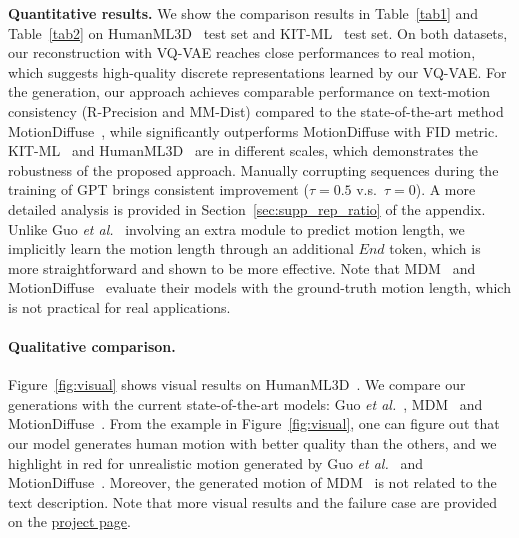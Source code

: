 \documentclass[10pt,twocolumn,letterpaper]{article}
\begin{document}
\noindent\textbf{Quantitative results.} 
We show the comparison results in Table~\ref{tab1} and Table~\ref{tab2} on HumanML3D~\cite{guo2022generating} test set and KIT-ML~\cite{plappert2016kit} test set. On both datasets, our reconstruction with VQ-VAE reaches close performances to real motion, which suggests high-quality discrete representations learned by our VQ-VAE. For the generation, our approach achieves comparable performance on text-motion consistency (R-Precision and MM-Dist) compared to the state-of-the-art method MotionDiffuse~\cite{zhang2022motiondiffuse}, while significantly outperforms MotionDiffuse with FID metric. KIT-ML~\cite{plappert2016kit} and HumanML3D~\cite{guo2022generating} are in different scales, which demonstrates the robustness of the proposed approach. Manually corrupting sequences during the training of GPT brings consistent improvement ($\tau = 0.5$ v.s.~$\tau = 0$). A more detailed analysis is provided in Section~\ref{sec:supp_rep_ratio} of the appendix. Unlike Guo \textit{et al.}~\cite{guo2022generating} involving an extra module to predict motion length, we implicitly learn the motion length through an additional $\mathit{End}$ token, which is more straightforward and shown to be more effective. Note that MDM~\cite{tevet2022MDM} and MotionDiffuse~\cite{zhang2022motiondiffuse} evaluate their models with the ground-truth motion length, which is not practical for real applications. 

\paragraph{Qualitative comparison.}
Figure~\ref{fig:visual} shows visual results on HumanML3D~\cite{guo2022generating}. We compare our generations with the current state-of-the-art models: Guo \textit{et al.}~\cite{guo2022generating}, MDM~\cite{tevet2022MDM} and MotionDiffuse~\cite{zhang2022motiondiffuse}. From the example in Figure~\ref{fig:visual}, one can figure out that our model generates human motion with better quality than the others, and we highlight in red for unrealistic motion generated by Guo \textit{et al.}~\cite{guo2022generating} and MotionDiffuse~\cite{zhang2022motiondiffuse}. Moreover, the generated motion of MDM~\cite{tevet2022MDM} is not related to the text description. Note that more visual results and the failure case are provided on the \href{https://mael-zys.github.io/T2M-GPT/}{project page}.
\end{document}
